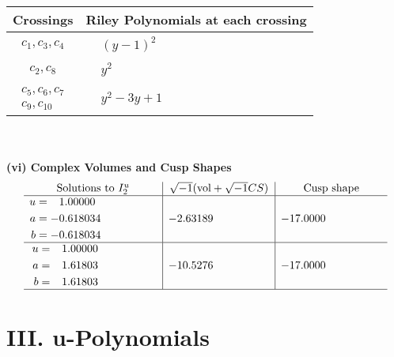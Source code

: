\documentclass[1p]{elsarticle_modified}
\theoremstyle{definition}
\newcommand{\I}{\sqrt{-1}}
\begin{document}
\begin{tabular}{m{50pt}|m{274pt}}
Crossings & \hspace{64pt}Riley Polynomials at each crossing \\
\hline $$\begin{aligned}c_{1},c_{3},c_{4}\end{aligned}$$&$\begin{aligned}
&(y-1)^2
\end{aligned}$\\
\hline $$\begin{aligned}c_{2},c_{8}\end{aligned}$$&$\begin{aligned}
&y^2
\end{aligned}$\\
\hline $$\begin{aligned}c_{5},c_{6},c_{7}\\c_{9},c_{10}\end{aligned}$$&$\begin{aligned}
&y^2-3 y+1
\end{aligned}$\\
\hline
\end{tabular}\\~\\
\newpage\flushleft \textbf{(vi) Complex Volumes and Cusp Shapes}
$$\begin{array}{c|c|c}  
\text{Solutions to }I^u_{2}& \I (\text{vol} + \sqrt{-1}CS) & \text{Cusp shape}\\
 \hline 
\begin{aligned}
u &= \phantom{-}1.00000\phantom{ +0.000000I} \\
a &= -0.618034\phantom{ +0.000000I} \\
b &= -0.618034\phantom{ +0.000000I}\end{aligned}
 & -2.63189\phantom{ +0.000000I} & -17.0000\phantom{ +0.000000I} \\ \hline\begin{aligned}
u &= \phantom{-}1.00000\phantom{ +0.000000I} \\
a &= \phantom{-}1.61803\phantom{ +0.000000I} \\
b &= \phantom{-}1.61803\phantom{ +0.000000I}\end{aligned}
 & -10.5276\phantom{ +0.000000I} & -17.0000\phantom{ +0.000000I}\\
 \hline 
 \end{array}$$\newpage
\newpage\renewcommand{\arraystretch}{1}
\centering \section*{ III. u-Polynomials}
\end{document}
